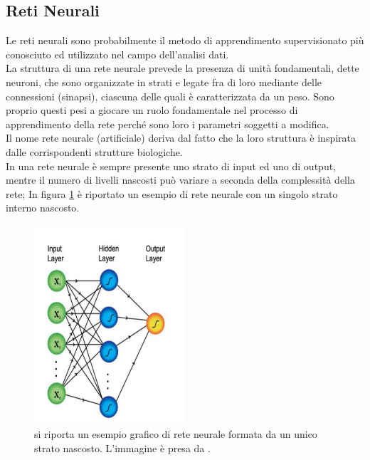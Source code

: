 \newpage


\subsection{Reti Neurali}
\label{reti neurali}
Le reti neurali sono probabilmente il metodo di apprendimento supervisionato più conosciuto ed utilizzato nel campo dell'analisi dati. \\
La struttura di una rete neurale prevede la presenza di unità fondamentali, dette neuroni, che sono organizzate in strati e legate fra di loro mediante delle connessioni (sinapsi), ciascuna delle quali è caratterizzata da un peso. Sono proprio questi pesi a giocare un ruolo fondamentale nel processo di apprendimento della rete perché sono loro i parametri soggetti a modifica.\\
Il nome rete neurale (artificiale) deriva dal fatto che la loro struttura è inspirata dalle corrispondenti strutture biologiche. \\
In una rete neurale è sempre presente uno strato di input ed uno di output, mentre il numero di livelli nascosti può variare a seconda della complessità della rete; In figura \ref{fig:schemaNN} è riportato un esempio di rete neurale con un singolo strato interno nascosto.
\begin{figure}[h!]
	\centering
	\includegraphics[width=0.50\textwidth]{figs/schemaNN.png}
	\caption{si riporta un esempio grafico di rete neurale formata da un unico strato nascosto. L'immagine è presa da \cite{Metodi_multivariati}.}
	\label{fig:schemaNN}
\end{figure}
\\
